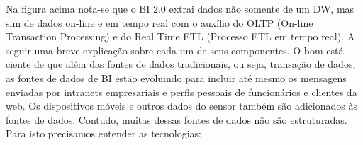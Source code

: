Na figura acima nota-se que o BI 2.0 extrai dados n\~{a}o somente de um DW, mas sim de dados on-line e em tempo real com o auxílio do OLTP (On-line Transaction Processing) e do Real Time ETL (Processo ETL em tempo real). A seguir uma breve explica\c{c}\~{a}o sobre cada um de seus componentes. O bom est\'{a} ciente de que al\'{e}m das fontes de dados tradicionais, ou seja, transa\c{c}\~{a}o de dados, as fontes de dados de BI est\~{a}o evoluindo para incluir at\'{e} mesmo os mensagens enviadas por intranets empresariais e perfis pessoais de funcion\'{a}rios e clientes da web. Os dispositivos móveis e outros dados do sensor tamb\'{e}m s\~{a}o adicionados \`{a}s fontes de dados. Contudo, muitas dessas fontes de dados n\~{a}o s\~{a}o estruturadas. Para isto precisamos entender as tecnologias:

\begin{itemize}


\end{itemize}
